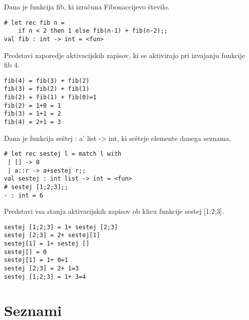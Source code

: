\begin{ex}
Dana je funkcija fib, ki izra\v cuna Fibonaccijevo \v stevilo.

\begin{lstlisting}
# let rec fib n =
    if n < 2 then 1 else fib(n-1) + fib(n-2);;
val fib : int -> int = <fun>
\end{lstlisting}
Predstavi zaporedje aktivacijskih zapisov, ki se aktivirajo pri izvajanju funkcije fib 4.

\begin{sol}
\begin{lstlisting}
fib(4) = fib(3) + fib(2)
fib(3) = fib(2) + fib(1)
fib(2) = fib(1) + fib(0)=1
fib(2) = 1+0 = 1
fib(3) = 1+1 = 2
fib(4) = 2+1 = 3
\end{lstlisting}
\end{sol}

\end{ex}
\begin{ex}
Dana je funkcija se\v stej : a' list -> int, ki se\v steje elemente danega seznama.

\begin{lstlisting}
# let rec sestej l = match l with
 | [] -> 0
 | a::r -> a+sestej r;; 
val sestej : int list -> int = <fun> 
# sestej [1;2;3];; 
- : int = 6 

\end{lstlisting}
Predstavi vsa stanja aktivacijskih zapisov ob klicu funkcije sestej [1;2;3].

\begin{sol}
\begin{lstlisting}
sestej [1;2;3] = 1+ sestej [2;3]
sestej [2;3] = 2+ sestej[1]
sestej[1] = 1+ sestej []
sestej[] = 0
sestej[1] = 1+ 0=1
sestej [2;3] = 2+ 1=3
sestej [1;2;3] = 1+ 3=4
\end{lstlisting}
\end{sol}

\end{ex}


\section{Seznami}

